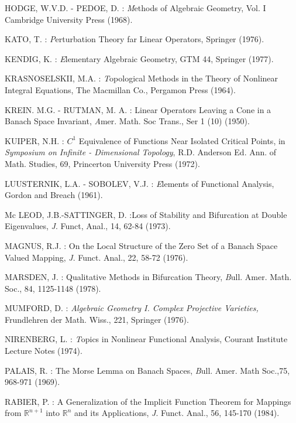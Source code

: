 \begin{thebibliography}{99}
 {HODGE, W.V.D. - PEDOE, D. :} {\textit Methods of
  Algebraic Geometry,} Vol. I Cambridge University Press (1968).

 {KATO, T. :} {\textit Perturbation Theory far Linear
  Operators,} Springer (1976).

 {KENDIG, K. :} {\textit Elementary Algebraic Geometry,}
  GTM 44, Springer (1977).

 {KRASNOSELSKII, M.A. :} {\textit Topological Methods in
  the Theory of Nonlinear Integral Equations}, The Macmillan Co.,
  Pergamon Press (1964).

 {KREIN. M.G. - RUTMAN, M. A. :} Linear Operators Leaving
  a Cone in a Banach Space Invariant, {\textit Amer. Math. Soc
    Trans.,} Ser 1 (10) (1950).

 {KUIPER, N.H. :} $C^{1}$ Equivalence of Functions Near
  Isolated Critical Points, in {\em Symposium on Infinite -
    Dimensional Topology}, R.D. Anderson Ed. Ann. of Math. Studies,
  69, Princerton University Press (1972).

 {LUUSTERNIK, L.A. - SOBOLEV, V.J. :} {\textit Elements of
Functional Analysis}, Gordon and Breach (1961).

 {Mc LEOD, J.B.-SATTINGER, D. :}\pageoriginale Loss of
  Stability and Bifurcation at Double Eigenvalues, {\textit J. Funct,
    Anal.,} 14, 62-84 (1973).

 {MAGNUS, R.J. :} On the Local Structure of the Zero Set
  of a Banach Space Valued Mapping, {\textit J. Funct. Anal.,} 22,
  58-72 (1976).

 {MARSDEN, J. :} Qualitative Methods in Bifurcation
  Theory, {\textit Bull. Amer. Math. Soc.,} 84, 1125-1148 (1978).

 {MUMFORD, D. :} {\em Algebraic Geometry I. Complex
  Projective Varieties,} Frundlehren der Math. Wiss., 221, Springer (1976).

 {NIRENBERG, L. :} {\textit Topics in Nonlinear Functional
Analysis}, Courant Institute Lecture Notes (1974).

 {PALAIS, R. :} The Morse Lemma on Banach Spaces, {\textit
Bull. Amer. Math Soc.,}75, 968-971 (1969).

 {RABIER, P. :} A Generalization of the Implicit Function
  Theorem for Mappings from $\mathbb{R}^{n+1}$ into $\mathbb{R}^{n}$
  and its Applications, {\textit J. Funct. Anal.,} 56, 145-170 (1984).


\end{thebibliography}
